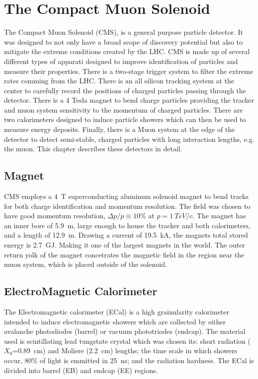 \section{The Compact Muon Solenoid}
\label{sec:CMS}

The Compact Muon Solenoid (CMS), is a general purpose particle detector.  It
was designed to not only have a broad scope of discovery potential but also
to mitigate the extreme conditions created by the LHC.  CMS is made up of
several different types of apparati designed to improve identification of 
particles and measure their properties.  There is a two-stage trigger system
to filter the extreme rates comming from the LHC.  There is an all silicon 
tracking system at the center to carefully record the positions of charged 
particles passing through the detector.  There is a 4 Tesla magnet to bend 
charge particles 
providing the tracker and muon system sensitivity to the momentum of charged 
particles.  There are two calorimeters designed to induce particle showers 
which can then be used to measure energy deposits.  Finally, there is a Muon 
system 
at the edge of the detector to detect semi-stable, charged particles with long 
interaction lengths, e.g. the muon. This chapter describes these detectors in
detail. 

\subsection{Magnet}
\label{sec:Magnet}

CMS employs a 4~T superconducting aluminum solenoid magnet to bend tracks for 
both charge identification and momentum resolution.  The field was
chosen to have good momentum resolution, $\Delta p/p\equiv10\%$ at 
$p=1~TeV/c$.  The magnet has an inner bore of 5.9~m, large enough to house
the tracker and both calorimeters, and a length of 12.9~m.  Drawing a 
current of 19.5~kA, the magnets total stored energy is 2.7~GJ.  Making it
one of the largest magnets in the world.  
The outer return yolk of the magnet concetrates the magnetic field in the
region near the muon system, which is placed outside of the solenoid.  

\subsection{ElectroMagnetic Calorimeter}
\label{sec:ECal}

The Electromagnetic calorimeter (ECal) is a high grainularity calorimeter
intended to induce electromagnetic showers which are collected by either
avalanche photodiodes (barrel) or vacuum phototriodes (endcap).  The 
material used is scintillating lead tungstate crystal
which was chosen its: short radiation ($X_0$=0.89~cm) and Moliere (2.2~cm) 
lengths; the time scale in which showers occur, 80\% of light is emmitted
in 25~ns; and the radiation hardness.  The ECal is divided into barrel (EB)
and endcap (EE) regions.

